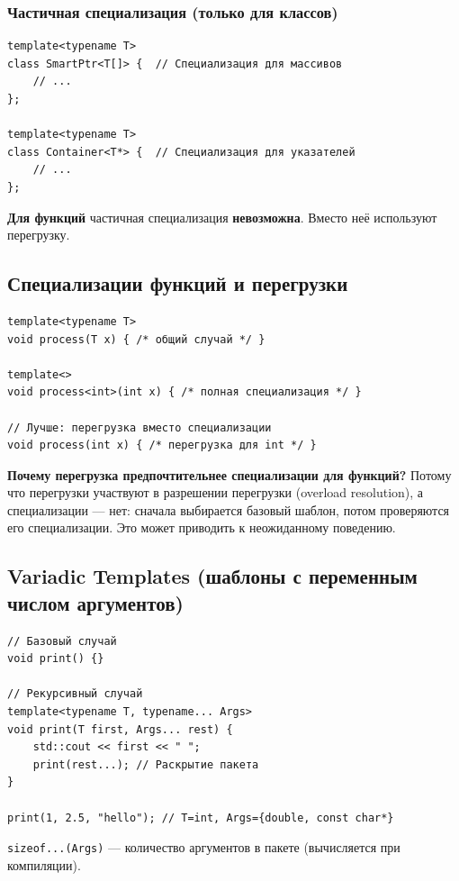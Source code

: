 \documentclass[12pt,a4paper]{article}
\begin{document}
\subsubsection{Частичная специализация (только для классов)}
\begin{lstlisting}
template<typename T>
class SmartPtr<T[]> {  // Специализация для массивов
    // ...
};

template<typename T>
class Container<T*> {  // Специализация для указателей
    // ...
};
\end{lstlisting}

\textbf{Для функций} частичная специализация \textbf{невозможна}. Вместо неё используют перегрузку.

\subsection{Специализации функций и перегрузки}

\begin{lstlisting}
template<typename T>
void process(T x) { /* общий случай */ }

template<>
void process<int>(int x) { /* полная специализация */ }

// Лучше: перегрузка вместо специализации
void process(int x) { /* перегрузка для int */ }
\end{lstlisting}

\textbf{Почему перегрузка предпочтительнее специализации для функций?} Потому что перегрузки участвуют в разрешении перегрузки (overload resolution), а специализации --- нет: сначала выбирается базовый шаблон, потом проверяются его специализации. Это может приводить к неожиданному поведению.

\subsection{Variadic Templates (шаблоны с переменным числом аргументов)}

\begin{lstlisting}
// Базовый случай
void print() {}

// Рекурсивный случай
template<typename T, typename... Args>
void print(T first, Args... rest) {
    std::cout << first << " ";
    print(rest...); // Раскрытие пакета
}

print(1, 2.5, "hello"); // T=int, Args={double, const char*}
\end{lstlisting}

\texttt{sizeof...(Args)} --- количество аргументов в пакете (вычисляется при компиляции).
\end{document}
